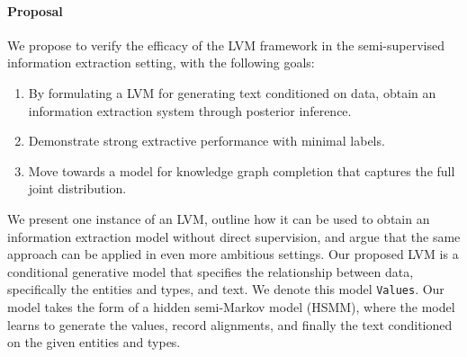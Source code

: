 \documentclass[12pt]{article}
\newcommand{\ba}{\mathbf{a}}
\newcommand{\be}{\mathbf{e}}
\newcommand{\bt}{\mathbf{t}}
\newcommand{\bv}{\mathbf{v}}
\newcommand{\by}{\mathbf{y}}
\begin{document}
\paragraph{Proposal}
We propose to verify the efficacy of the LVM framework in the
semi-supervised information extraction setting,
with the following goals:
\begin{enumerate}
\item By formulating a LVM for generating text conditioned on data,
    obtain an information extraction system through posterior inference.
\item Demonstrate strong extractive performance with minimal labels.
\item Move towards a model for knowledge graph completion that captures
    the full joint distribution.
\end{enumerate}
We present one instance of an LVM, outline how it can be used to obtain
an information extraction model without direct supervision,
and argue that the same approach can be applied in even more ambitious settings.
Our proposed LVM is a conditional generative model that specifies
the relationship between data, specifically the entities and types, and text.
We denote this model \texttt{Values}.
Our model takes the form of a hidden semi-Markov model (HSMM),
where the model learns to generate the values, record alignments, and finally the text
conditioned on the given entities and types.
\end{document}
